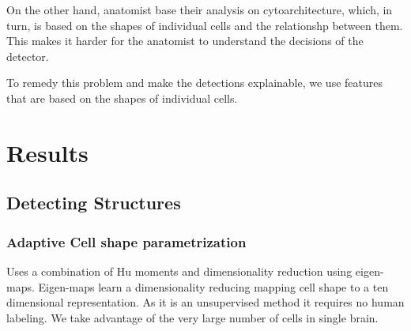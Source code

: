 \documentclass[runningheads]{llncs}
\begin{document}
On the other hand, anatomist base their analysis on cytoarchitecture,
which, in turn, is based on the shapes of individual cells and the
relationshp between them. This makes it harder for the anatomist to
understand the decisions of the detector.

To remedy this problem and make the detections explainable, we use
features that are based on the shapes of individual cells.

\section{Results}

\subsection{Detecting Structures}

\subsubsection{Adaptive Cell shape parametrization} Uses a combination of Hu moments and dimensionality reduction using eigen-maps.
Eigen-maps learn a dimensionality reducing mapping cell shape to a ten dimensional representation.
As it is an unsupervised method it requires no human labeling. We take advantage of the very large number of cells in single brain. 
\end{document}

